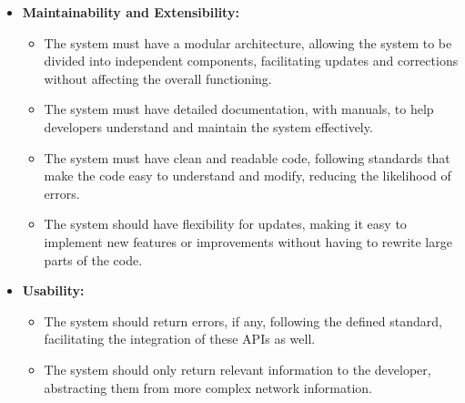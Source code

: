 \begin{itemize}
  \item \textbf{Maintainability and Extensibility:}
    \begin{itemize}
      \item The system must have a modular architecture, allowing the system to
        be divided into independent components, facilitating updates and
        corrections without affecting the overall functioning.

      \item The system must have detailed documentation, with manuals, to help
        developers understand and maintain the system effectively.

      \item The system must have clean and readable code, following standards
        that make the code easy to understand and modify, reducing the
        likelihood of errors.

      \item The system should have flexibility for updates, making it easy to
        implement new features or improvements without having to rewrite large
        parts of the code.
    \end{itemize}

  \item \textbf{Usability:}
    \begin{itemize}
      \item The system should return errors, if any, following the defined
        standard, facilitating the integration of these APIs as well.

      \item The system should only return relevant information to the
        developer, abstracting them from more complex network information.
    \end{itemize}
\end{itemize}
